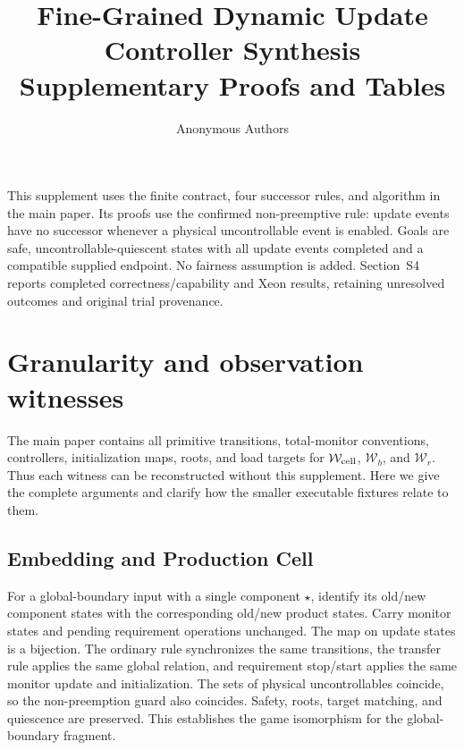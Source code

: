 \documentclass[11pt]{article}
\title{Fine-Grained Dynamic Update Controller Synthesis\\Supplementary Proofs and Tables}
\author{Anonymous Authors}
\date{}
\begin{document}
\maketitle
This supplement uses the finite contract, four successor rules, and algorithm in the main paper. Its proofs use the confirmed non-preemptive rule: update events have no successor whenever a physical uncontrollable event is enabled. Goals are safe, uncontrollable-quiescent states with all update events completed and a compatible supplied endpoint. No fairness assumption is added. Section~S4 reports completed correctness/capability and Xeon results, retaining unresolved outcomes and original trial provenance.

\section{Granularity and observation witnesses}
\label{supp:witnesses}
The main paper contains all primitive transitions, total-monitor conventions, controllers, initialization maps, roots, and load targets for $\mathcal W_{\rm cell}$, $\mathcal W_b$, and $\mathcal W_r$. Thus each witness can be reconstructed without this supplement. Here we give the complete arguments and clarify how the smaller executable fixtures relate to them.

\subsection{Embedding and Production Cell}
For a global-boundary input with a single component $\star$, identify its old/new component states with the corresponding old/new product states. Carry monitor states and pending requirement operations unchanged. The map on update states is a bijection. The ordinary rule synchronizes the same transitions, the transfer rule applies the same global relation, and requirement stop/start applies the same monitor update and initialization. The sets of physical uncontrollables coincide, so the non-preemption guard also coincides. Safety, roots, target matching, and quiescence are preserved. This establishes the game isomorphism for the global-boundary fragment.
\end{document}
